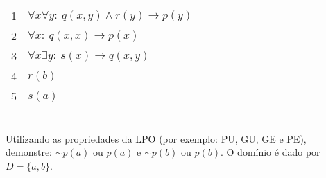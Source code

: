 \documentclass[11pt, a4paper,final]{article}
\begin{document}
\begin{enumerate}
\begin{tabular}{ll}
1 &  $\forall x\forall y:~ q(x,y) \wedge r(y) \rightarrow p(y) $ \\
2 &  $\forall x:~  q(x,x) \rightarrow p(x)  $ \\
3 &  $\forall x\exists y:~  s(x) \rightarrow q(x,y) $ \\
4 &  $r(b)$ \\ 
5 &  $s(a)$ \\
\end{tabular}\\
Utilizando as propriedades da LPO (por exemplo: PU, GU, GE e PE), 
demonstre: $\sim p(a)$ ou $p(a)$ e $\sim p(b)$ ou $p(b)$.
O domínio é dado por $D=\{a,b\}$. 

\begin{comment}

\item {\bf (1.5 pts)} Considere a seguinte interpretação em um domínio dado por $D=\{a,b\}$. 

\begin{tabular}{c |c | c | c } \hline \hline 
p(a,a) & p(a,b)  & p(b,a) & p(b,b)  \\  \hline 
 V & F & F & V \\ \hline \hline 
\end{tabular}

Determine o valor verdade ($f_{aval}$  ou $\Phi $), passo-a-passo, das seguintes fórmulas:

\begin{enumerate}
\itemsep -2pt
\item $\forall x \exists y:~ \:\: p(x,y) $
\item $\forall x \forall y:~ \:\: p(x,y) $
\item $\exists x \forall y:~ \:\: p(x,y) $
\item $\exists y:~ \:\: \sim p(a,y) $
\item $\forall x \forall y:~ \:\: (p(x,y) \rightarrow p(y,x)) $
\item $\forall x:~  \:\: p(x,x) $
\end{enumerate}

\newpage
\end{comment}



\end{enumerate}
\end{document}
